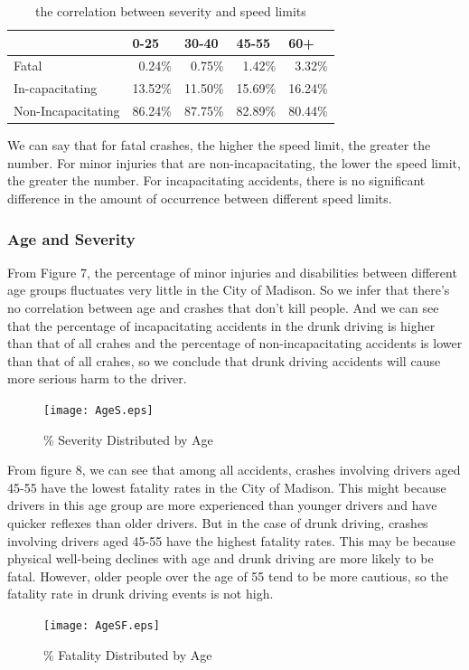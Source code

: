 \documentclass[15pt]{article}
\begin{document}
\begin{table}[htbp]
  \centering
  \caption{the correlation between severity and speed limits}
    \begin{tabular}{lrrrr}
    \hline
          & \multicolumn{1}{l}{0-25} & \multicolumn{1}{l}{30-40} & \multicolumn{1}{l}{45-55} & \multicolumn{1}{l}{60+} \\
    \hline
    Fatal & 0.24\% & 0.75\% & 1.42\% & 3.32\% \\
    In-capacitating & 13.52\% & 11.50\% & 15.69\% & 16.24\% \\
    Non-Incapacitating & 86.24\% & 87.75\% & 82.89\% & 80.44\% \\
    \hline
    \end{tabular}%
  \label{tab:addlabel}%
\end{table}%

We can say that for fatal crashes, the higher the speed limit, the greater the number. For minor injuries that are non-incapacitating, the lower the speed limit, the greater the number. For incapacitating accidents, there is no significant difference in the amount of occurrence between different speed limits.

\subsubsection{Age and Severity}
From Figure 7, the percentage of minor injuries and disabilities between different age groups fluctuates very little in the City of Madison. So we infer that there's no correlation between age and crashes that don't kill people. And we can see that the percentage of incapacitating accidents in the drunk driving is higher than that of all crahes and the percentage of non-incapacitating accidents is lower than that of all crahes, so we conclude that drunk driving accidents will cause more serious harm to the driver.
\begin{figure}[H]
\centering
\texttt{[image: AgeS.eps]}
\caption{\% Severity Distributed by Age}
\label{19}
\end{figure}

From figure 8, we can see that among all accidents, crashes involving drivers aged 45-55 have the lowest fatality rates in the City of Madison. This might because drivers in this age group are more experienced than younger drivers and have quicker reflexes than older drivers. But in the case of drunk driving, crashes involving drivers aged 45-55 have the highest fatality rates. This may be because physical well-being declines with age and drunk driving are more likely to be fatal. However, older people over the age of 55 tend to be more cautious, so the fatality rate in drunk driving events is not high.
\begin{figure}[H]
\centering
\texttt{[image: AgeSF.eps]}
\caption{\% Fatality Distributed by Age}
\label{21}
\end{figure}
\end{document}
